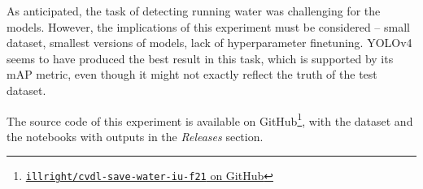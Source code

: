 \documentclass[journal,onecolumn]{IEEEtran}
\begin{document}
As anticipated, the task of detecting running water was challenging for the models. However, the implications of this experiment must be considered – small dataset, smallest versions of models, lack of hyperparameter finetuning. YOLOv4 seems to have produced the best result in this task, which is supported by its mAP metric, even though it might not exactly reflect the truth of the test dataset.

The source code of this experiment is available on GitHub\footnote{\href{https://github.com/illright/cvdl-save-water-iu-f21}{\texttt{illright/cvdl-save-water-iu-f21} on GitHub}}, with the dataset and the notebooks with outputs in the \emph{Releases} section.
\end{document}
